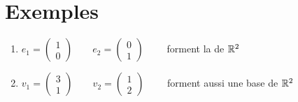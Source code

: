 \section{Exemples}

\begin{frame}
\begin{exemple}
\begin{enumerate}
  \item 
  $e_1=\left(\begin{smallmatrix}1\\0\end{smallmatrix}\right)\qquad
  e_2 = \left(\begin{smallmatrix}0\\1\end{smallmatrix}\right)\qquad$ forment la
  de $\mathbb{R}^2$
 


  \pause
  \item $v_1=\left(\begin{smallmatrix}3\\1\end{smallmatrix}\right)\qquad 
  v_2=\left(\begin{smallmatrix}1\\2\end{smallmatrix}\right)\qquad$
forment aussi une base de $\mathbb{R}^2$



\end{enumerate}
\end{exemple}
\end{frame}
